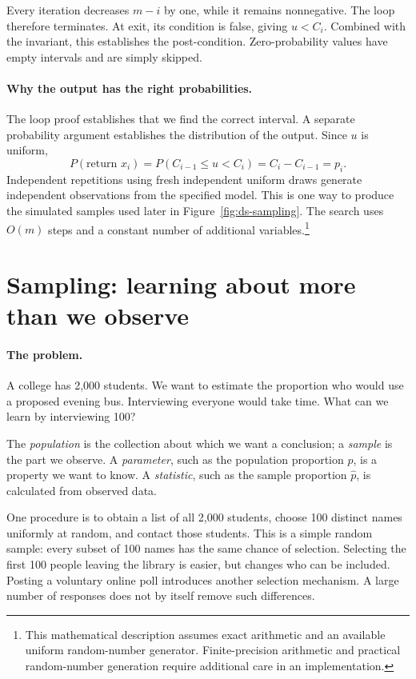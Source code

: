 Every iteration decreases $m-i$ by one, while it remains nonnegative.
The loop therefore terminates. At exit, its condition is false, giving
$u<C_i$. Combined with the invariant, this establishes the post-condition.
Zero-probability values have empty intervals and are simply skipped.

\paragraph{Why the output has the right probabilities.}
The loop proof establishes that we find the correct interval. A separate
probability argument establishes the distribution of the output. Since
$u$ is uniform,
\[
 P(\text{return }x_i)
 =P(C_{i-1}\leq u<C_i)=C_i-C_{i-1}=p_i.
\]
Independent repetitions using fresh independent uniform draws generate
independent observations from the specified model. This is one way to
produce the simulated samples used later in Figure~\ref{fig:ds-sampling}.
The search uses $O(m)$ steps and a constant number of additional
variables.\footnote{This mathematical description assumes exact arithmetic
and an available uniform random-number generator. Finite-precision
arithmetic and practical random-number generation require additional care
in an implementation.}

\section{Sampling: learning about more than we observe}
\label{sec:ds-sampling}
\paragraph{The problem.}
A college has 2,000 students. We want to estimate the proportion who would
use a proposed evening bus. Interviewing everyone would take time. What
can we learn by interviewing 100?

The \emph{population} is the collection about which we want a conclusion;
a \emph{sample} is the part we observe. A \emph{parameter}, such as the
population proportion $p$, is a property we want to know. A
\emph{statistic}, such as the sample proportion $\hat p$, is calculated
from observed data.

One procedure is to obtain a list of all 2,000 students, choose 100 distinct
names uniformly at random, and contact those students. This is a simple
random sample: every subset of 100 names has the same chance of selection.
Selecting the first 100 people leaving the library is easier, but changes
who can be included. Posting a voluntary online poll introduces another
selection mechanism. A large number of responses does not by itself
remove such differences.

